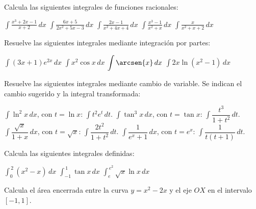 \begin{ejemplo}{
Calcula las siguientes integrales de funciones racionales:
\begin{apartados}
 \ap $\displaystyle{\int\frac{x^3+2x-1}{x+2}\,dx}$
 \ap $\displaystyle{\int\frac{6x+5}{2x^2+5x-3}\,dx}$
 \ap $\displaystyle{\int\frac{2x-1}{x^2+4x+4}\,dx}$
 \ap $\displaystyle{\int\frac{x^3-1}{x^2+x}\,dx}$
 \ap $\displaystyle{\int\frac{x}{x^2+x+2}\,dx}$
\end{apartados}
}
\end{ejemplo}

\begin{ejemplo}{Resuelve las siguientes integrales mediante integración por partes:
\begin{apartados}
    \ap $\displaystyle{\int (3x+1)e^{2x}\,dx}$
    \ap $\displaystyle{\int x^2\cos{x}\,dx}$
    \ap $\displaystyle{\int\arcsen{x}\,dx}$
    \ap $\displaystyle{\int 2x\ln{(x^2-1)}\,dx}$
\end{apartados}
}
\end{ejemplo}

\begin{ejemplo}{
Resuelve las siguientes integrales mediante cambio de variable. Se indican el cambio sugerido y la integral transformada:
\begin{apartados}
    \ap $\displaystyle\int\ln^2 x\,dx$, con $t=\ln x$:
        $\displaystyle\int t^2e^t\,dt$.
    \ap $\displaystyle\int\tan^3 x\,dx$, con $t=\tan x$:
        $\displaystyle\int\dfrac{t^3}{1+t^2}\,dt$.
    \ap $\displaystyle\int\dfrac{\sqrt{x}}{1+x}\,dx$, con $t=\sqrt{x}$:
        $\displaystyle\int\dfrac{2t^2}{1+t^2}\,dt$.
    \ap $\displaystyle\int\dfrac1{e^x+1}\,dx$, con $t=e^x$:
        $\displaystyle\int\dfrac1{t(t+1)}\,dt$.
\end{apartados}
}
\end{ejemplo}


\begin{ejemplo}{
Calcula las siguientes integrales definidas:
\begin{apartados}
 \ap $\displaystyle{\int_0^{\,2}(x^2-x)\,dx}$
 \ap $\displaystyle{\int_{-1}^{\,1}\tan{x}\,dx}$
 \ap $\displaystyle{\int_e^{\,e^2}\sqrt{x}\ln{x}\,dx}$
\end{apartados}
}
\end{ejemplo}

\begin{ejemplo}{
    Calcula el área encerrada entre la curva $y=x^2-2x$ y el eje $OX$ en el intervalo $[-1,1]$.
}
\end{ejemplo}

